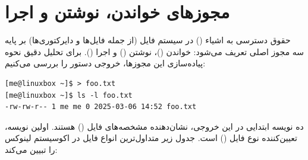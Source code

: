 \section{مجوزهای خواندن، نوشتن و اجرا}

حقوق دسترسی به اشیاء () در سیستم فایل (از جمله فایل‌ها و دایرکتوری‌ها) بر پایه سه مجوز اصلی تعریف می‌شود: خواندن ()، نوشتن () و اجرا (). برای تحلیل دقیق نحوه پیاده‌سازی این مجوزها، خروجی دستور  را بررسی می‌کنیم:

\begin{latin}
\begin{lstlisting}
[me@linuxbox ~]$ > foo.txt
[me@linuxbox ~]$ ls -l foo.txt
-rw-rw-r-- 1 me me 0 2025-03-06 14:52 foo.txt
\end{lstlisting}
\end{latin}

ده نویسه ابتدایی در این خروجی، نشان‌دهنده مشخصه‌های فایل () هستند. اولین نویسه، تعیین‌کننده نوع فایل () است. جدول زیر متداول‌ترین انواع فایل در اکوسیستم لینوکس را تبیین می‌کند:

